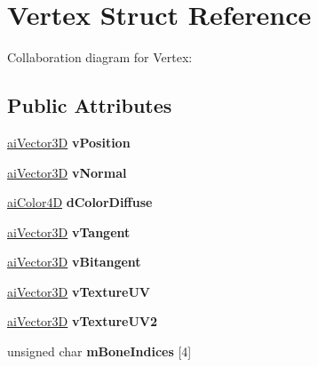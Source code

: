 \hypertarget{struct_vertex}{\section{Vertex Struct Reference}
\label{struct_vertex}
}


Collaboration diagram for Vertex\+:
\subsection*{Public Attributes}
\begin{DoxyCompactItemize}
\item 
\hypertarget{struct_vertex_aa6a3bad5366a0a765ac5f7c28ec730be}{\hyperlink{structai_vector3_d}{ai\+Vector3\+D} {\bfseries v\+Position}}\label{struct_vertex_aa6a3bad5366a0a765ac5f7c28ec730be}

\item 
\hypertarget{struct_vertex_ae9362ad264165d65245efb427a8e14ac}{\hyperlink{structai_vector3_d}{ai\+Vector3\+D} {\bfseries v\+Normal}}\label{struct_vertex_ae9362ad264165d65245efb427a8e14ac}

\item 
\hypertarget{struct_vertex_a9cee02c48453a236edab6772093b1136}{\hyperlink{structai_color4_d}{ai\+Color4\+D} {\bfseries d\+Color\+Diffuse}}\label{struct_vertex_a9cee02c48453a236edab6772093b1136}

\item 
\hypertarget{struct_vertex_aae6c2ce139bf94d12a4068c51bde0499}{\hyperlink{structai_vector3_d}{ai\+Vector3\+D} {\bfseries v\+Tangent}}\label{struct_vertex_aae6c2ce139bf94d12a4068c51bde0499}

\item 
\hypertarget{struct_vertex_a24e5fff162990695043d1b110ded9c08}{\hyperlink{structai_vector3_d}{ai\+Vector3\+D} {\bfseries v\+Bitangent}}\label{struct_vertex_a24e5fff162990695043d1b110ded9c08}

\item 
\hypertarget{struct_vertex_a329a10af01da2c3eaf71555fb5695f28}{\hyperlink{structai_vector3_d}{ai\+Vector3\+D} {\bfseries v\+Texture\+U\+V}}\label{struct_vertex_a329a10af01da2c3eaf71555fb5695f28}

\item 
\hypertarget{struct_vertex_a9f4aaa7ee47a1faeceb3fdce518690c1}{\hyperlink{structai_vector3_d}{ai\+Vector3\+D} {\bfseries v\+Texture\+U\+V2}}\label{struct_vertex_a9f4aaa7ee47a1faeceb3fdce518690c1}

\item 
\hypertarget{struct_vertex_a58b07cc5aa51658cfb8162728e66492a}{unsigned char {\bfseries m\+Bone\+Indices} \mbox{[}4\mbox{]}}\label{struct_vertex_a58b07cc5aa51658cfb8162728e66492a}


\end{DoxyCompactItemize}

